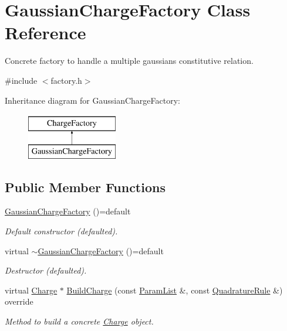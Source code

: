 \hypertarget{classGaussianChargeFactory}{\section{Gaussian\-Charge\-Factory Class Reference}
\label{classGaussianChargeFactory}
}


Concrete factory to handle a multiple gaussians constitutive relation.  




{\ttfamily \#include $<$factory.\-h$>$}

Inheritance diagram for Gaussian\-Charge\-Factory\-:\begin{figure}[H]
\begin{center}
\leavevmode
\includegraphics[height=2.000000cm]{classGaussianChargeFactory}
\end{center}
\end{figure}
\subsection*{Public Member Functions}
\begin{DoxyCompactItemize}
\item 
\hypertarget{classGaussianChargeFactory_aedb4a8bbdd1d9723ea5e732053fa8ffe}{\hyperlink{classGaussianChargeFactory_aedb4a8bbdd1d9723ea5e732053fa8ffe}{Gaussian\-Charge\-Factory} ()=default}\label{classGaussianChargeFactory_aedb4a8bbdd1d9723ea5e732053fa8ffe}

\begin{DoxyCompactList}\small\item\em Default constructor (defaulted). \end{DoxyCompactList}\item 
\hypertarget{classGaussianChargeFactory_a13ba2c7152c6f6c358afd62071c6e08b}{virtual \hyperlink{classGaussianChargeFactory_a13ba2c7152c6f6c358afd62071c6e08b}{$\sim$\-Gaussian\-Charge\-Factory} ()=default}\label{classGaussianChargeFactory_a13ba2c7152c6f6c358afd62071c6e08b}

\begin{DoxyCompactList}\small\item\em Destructor (defaulted). \end{DoxyCompactList}\item 
virtual \hyperlink{classCharge}{Charge} $\ast$ \hyperlink{classGaussianChargeFactory_a1e1718ca16c1624e98865bc6359c2136}{Build\-Charge} (const \hyperlink{classParamList}{Param\-List} \&, const \hyperlink{classQuadratureRule}{Quadrature\-Rule} \&) override
\begin{DoxyCompactList}\small\item\em Method to build a concrete \hyperlink{classCharge}{Charge} object. \end{DoxyCompactList}\end{DoxyCompactItemize}


